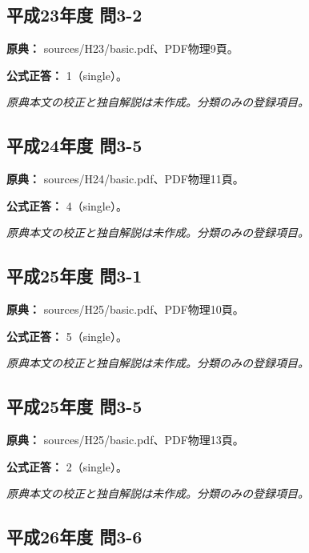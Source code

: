 \subsection{平成23年度 問3-2}
\label{q:h23-reg-basic-3-2}

\noindent\textbf{原典：} sources/H23/basic.pdf、PDF物理9頁。

\textbf{公式正答：} 1（single）。

\par\textit{原典本文の校正と独自解説は未作成。分類のみの登録項目。}

\subsection{平成24年度 問3-5}
\label{q:h24-reg-basic-3-5}

\noindent\textbf{原典：} sources/H24/basic.pdf、PDF物理11頁。

\textbf{公式正答：} 4（single）。

\par\textit{原典本文の校正と独自解説は未作成。分類のみの登録項目。}

\subsection{平成25年度 問3-1}
\label{q:h25-reg-basic-3-1}

\noindent\textbf{原典：} sources/H25/basic.pdf、PDF物理10頁。

\textbf{公式正答：} 5（single）。

\par\textit{原典本文の校正と独自解説は未作成。分類のみの登録項目。}

\subsection{平成25年度 問3-5}
\label{q:h25-reg-basic-3-5}

\noindent\textbf{原典：} sources/H25/basic.pdf、PDF物理13頁。

\textbf{公式正答：} 2（single）。

\par\textit{原典本文の校正と独自解説は未作成。分類のみの登録項目。}

\subsection{平成26年度 問3-6}
\label{q:h26-reg-basic-3-6}

